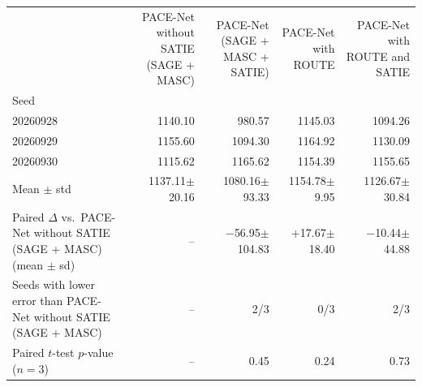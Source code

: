 \begin{tabular}{lrrrr}
\toprule
 & \multicolumn{1}{p{2.6cm}}{\raggedleft PACE-Net without SATIE (SAGE + MASC)} & \multicolumn{1}{p{3.4cm}}{\raggedleft PACE-Net (SAGE + MASC + SATIE)} & \multicolumn{1}{p{3cm}}{\raggedleft PACE-Net with ROUTE} & \multicolumn{1}{p{3.6cm}}{\raggedleft PACE-Net with ROUTE and SATIE}\\
Seed & & & &\\
\midrule
20260928 & 1140.10 & 980.57 & 1145.03 & 1094.26\\
20260929 & 1155.60 & 1094.30 & 1164.92 & 1130.09\\
20260930 & 1115.62 & 1165.62 & 1154.39 & 1155.65\\
\midrule
Mean $\pm$ std & 1137.11$\pm$20.16 & 1080.16$\pm$93.33 & 1154.78$\pm$9.95 & 1126.67$\pm$30.84\\
\midrule
Paired $\Delta$ vs.\ PACE-Net without SATIE (SAGE + MASC) (mean $\pm$ sd) & -- & $-$56.95$\pm$104.83 & +17.67$\pm$18.40 & $-$10.44$\pm$44.88\\
Seeds with lower error than PACE-Net without SATIE (SAGE + MASC) & -- & 2/3 & 0/3 & 2/3\\
Paired $t$-test $p$-value ($n{=}3$) & -- & 0.45 & 0.24 & 0.73\\
\bottomrule
\end{tabular}
